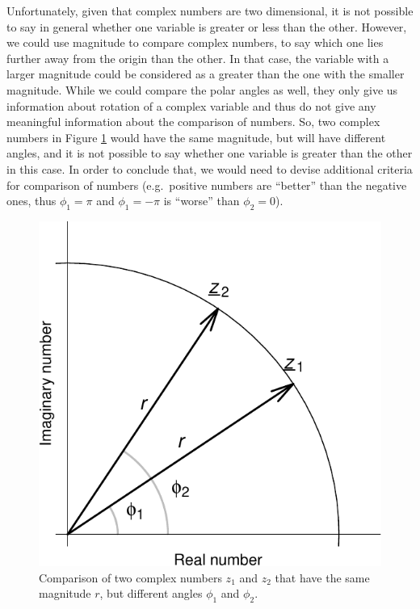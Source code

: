 \documentclass[
]{book}
\begin{document}
Unfortunately, given that complex numbers are two dimensional, it is not possible to say in general whether one variable is greater or less than the other. However, we could use magnitude to compare complex numbers, to say which one lies further away from the origin than the other. In that case, the variable with a larger magnitude could be considered as a greater than the one with the smaller magnitude. While we could compare the polar angles as well, they only give us information about rotation of a complex variable and thus do not give any meaningful information about the comparison of numbers. So, two complex numbers in Figure \ref{fig:complexPlaneCircle} would have the same magnitude, but will have different angles, and it is not possible to say whether one variable is greater than the other in this case. In order to conclude that, we would need to devise additional criteria for comparison of numbers (e.g.~positive numbers are ``better'' than the negative ones, thus \(\phi_1=\pi\) and \(\phi_1=-\pi\) is ``worse'' than \(\phi_2=0\)).

\begin{figure}
\centering
\includegraphics{Svetunkov---Svetunkov---Complex-Dynamic-Models_files/figure-latex/complexPlaneCircle-1.pdf}
\caption{\label{fig:complexPlaneCircle}Comparison of two complex numbers \(z_1\) and \(z_2\) that have the same magnitude \(r\), but different angles \(\phi_1\) and \(\phi_2\).}
\end{figure}
\end{document}
